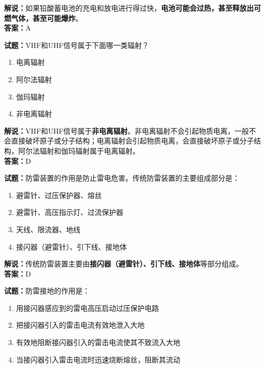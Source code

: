 \documentclass{ctexbook}
\begin{document}
\noindent\textbf{解说：}如果铅酸蓄电池的充电和放电进行得过快，\textbf{电池可能会过热，甚至释放出可燃气体，甚至可能爆炸}。\\\noindent\textbf{答案：}A%

\bigskip

\noindent\textbf{试题：}VHF和UHF信号属于下面哪一类辐射？

\begin{enumerate}[leftmargin=3em]
  \item 电离辐射
  \item 阿尔法辐射
  \item 伽玛辐射
  \item 非电离辐射
\end{enumerate}

\noindent\textbf{解说：}VHF和UHF信号属于\textbf{非电离辐射}。非电离辐射不会引起物质电离，一般不会直接破坏原子或分子结构；电离辐射会引起物质电离，会直接破坏原子或分子结构，阿尔法辐射和伽玛辐射属于电离辐射。\\\noindent\textbf{答案：}D

\bigskip

\noindent\textbf{试题：}防雷装置的作用是防止雷电危害。传统防雷装置的主要组成部分是：

\begin{enumerate}[leftmargin=3em]
  \item 避雷针、过压保护器、熔丝
  \item 避雷针、高压指示灯、过流保护器
  \item 天线、限流器、地线
  \item 接闪器（避雷针）、引下线、接地体
\end{enumerate}

\noindent\textbf{解说：}传统防雷装置主要由\textbf{接闪器（避雷针）、引下线、接地体}等部分组成。\\\noindent\textbf{答案：}D

\bigskip

\noindent\textbf{试题：}防雷接地的作用是：

\begin{enumerate}[leftmargin=3em]
  \item 用接闪器感应到的雷电高压启动过压保护电路
  \item 把接闪器引入的雷击电流有效地泄入大地
  \item 有效地阻断接闪器引入的雷击电流使其不致流入大地
  \item 当接闪器引入雷击电流时迅速烧断熔丝，阻断其流动
\end{enumerate}
\end{document}
